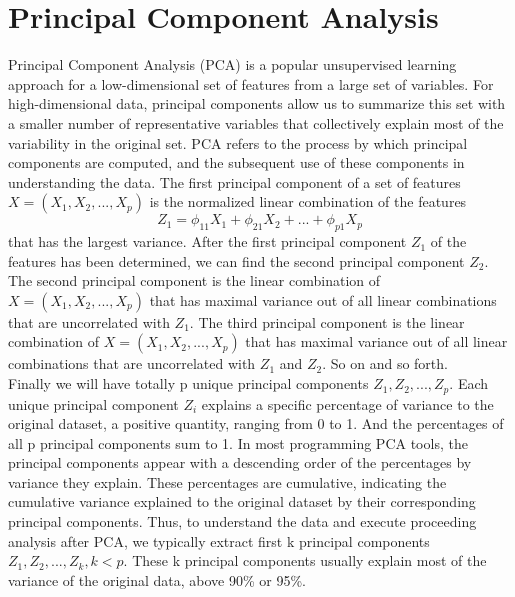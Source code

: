 \documentclass[12pt]{report} %
\begin{document}
\section{Principal Component Analysis}
Principal Component Analysis (PCA) is a popular unsupervised learning approach for a low-dimensional set of features from a large set of variables. For high-dimensional data, principal components allow us to summarize this set with a smaller number of representative variables that collectively explain most of the variability in the original set. PCA refers to the process by which principal components are computed, and the subsequent use of these components in understanding the data. The first principal component of a set of features \(X = (X_{1}, X_{2},..., X_{p})\) is the normalized linear combination of the features
\begin{equation}
Z_{1} = \phi_{11}X_{1} + \phi_{21}X_{2} +...+ \phi_{p1}X_{p}
\end{equation}
that has the largest variance. After the first principal component \(Z_{1}\) of the features has been determined, we can find the second principal component \(Z_{2}\). The second principal component is the linear combination of \(X = (X_{1}, X_{2},..., X_{p})\) that has maximal variance out of all linear combinations that are uncorrelated with \(Z_{1}\). The third principal component is the linear combination of \(X = (X_{1}, X_{2},..., X_{p})\) that has maximal variance out of all linear combinations that are uncorrelated with \(Z_{1}\) and \(Z_{2}\). So on and so forth\cite{STAT}. \\
Finally we will have totally p unique principal components \(Z_{1}, Z_{2},...,Z_{p}\). Each unique principal component \(Z_{i}\) explains a specific percentage of variance to the original dataset, a positive quantity, ranging from 0 to 1. And the percentages of all p principal components sum to 1. In most programming PCA tools, the principal components appear with a descending order of the percentages by variance they explain. These percentages are cumulative, indicating the cumulative variance explained to the original dataset by their corresponding principal components. Thus, to understand the data and execute proceeding analysis after PCA, we typically extract first k principal components \(Z_{1}, Z_{2},...,Z_{k}, k <p \). These k principal components usually explain most of the variance of the original data, above 90\% or 95\%.
\end{document}
